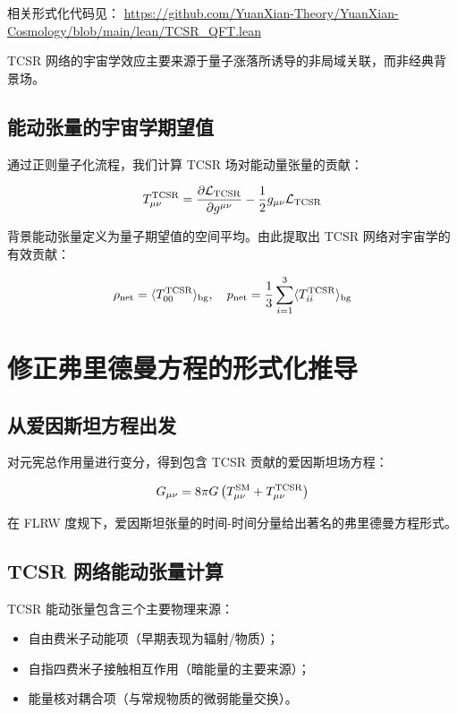 \documentclass[12pt,a4paper]{ctexart}
\begin{document}
相关形式化代码见：
\url{https://github.com/YuanXian-Theory/YuanXian-Cosmology/blob/main/lean/TCSR_QFT.lean}

TCSR 网络的宇宙学效应主要来源于量子涨落所诱导的非局域关联，而非经典背景场。

\subsection{能动张量的宇宙学期望值}

通过正则量子化流程，我们计算 TCSR 场对能动量张量的贡献：

\[
T_{\mu\nu}^{\rm TCSR} = \frac{\partial \mathcal{L}_{\rm TCSR}}{\partial g^{\mu\nu}} - \frac{1}{2} g_{\mu\nu} \mathcal{L}_{\rm TCSR}
\]

背景能动张量定义为量子期望值的空间平均。由此提取出 TCSR 网络对宇宙学的有效贡献：

\[
\rho_{\rm net} = \langle T_{00}^{\rm TCSR} \rangle_{\rm bg}, \quad p_{\rm net} = \frac{1}{3} \sum_{i=1}^3 \langle T_{ii}^{\rm TCSR} \rangle_{\rm bg}
\]

\section{修正弗里德曼方程的形式化推导}

\subsection{从爱因斯坦方程出发}

对元宪总作用量进行变分，得到包含 TCSR 贡献的爱因斯坦场方程：

\[
G_{\mu\nu} = 8\pi G \left( T_{\mu\nu}^{\rm SM} + T_{\mu\nu}^{\rm TCSR} \right)
\]

在 FLRW 度规下，爱因斯坦张量的时间-时间分量给出著名的弗里德曼方程形式。

\subsection{TCSR 网络能动张量计算}

TCSR 能动张量包含三个主要物理来源：
\begin{itemize}
    \item 自由费米子动能项（早期表现为辐射/物质）；
    \item 自指四费米子接触相互作用（暗能量的主要来源）；
    \item 能量核对耦合项（与常规物质的微弱能量交换）。
\end{itemize}
\end{document}
